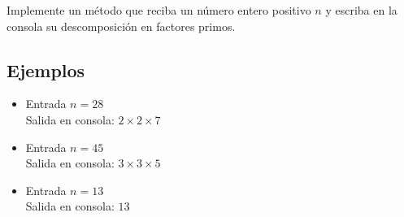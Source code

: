 Implemente un método que reciba un número entero positivo \( n \) y escriba en la consola su descomposición en factores primos.
\subsection*{Ejemplos}
\begin{itemize}
    \item Entrada \( n = 28 \)\\
    Salida en consola: \( 2 \times 2 \times 7 \)

    \item Entrada \( n = 45 \)\\
    Salida en consola: \( 3 \times 3 \times 5 \)

    \item Entrada \( n = 13 \)\\
    Salida en consola: \( 13 \)
\end{itemize}